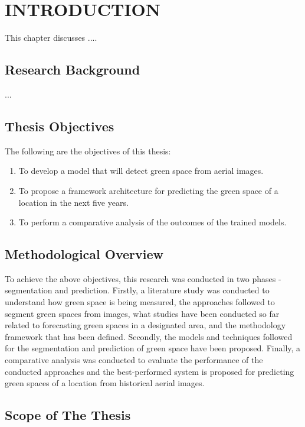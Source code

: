 
\chapter{INTRODUCTION}\label{intro}
\vspace{-3em}

This chapter discusses ....



\section{Research  Background}
...


\section{Thesis Objectives}

The following are the objectives of this thesis: 
\begin{enumerate}
    \item To develop a model that will detect green space from aerial images.

    \item To propose a framework architecture for predicting the green space of a location in the next five years.

    \item To perform a comparative analysis of the outcomes of the trained models.
\end{enumerate}


\section{Methodological Overview}
To achieve the above objectives, this research was conducted in two phases - segmentation and prediction. Firstly, a literature study was conducted to understand how green space is being measured, the approaches followed to segment green spaces from images, what studies have been conducted so far related to forecasting green spaces in a designated area, and the methodology framework that has been defined. Secondly, the models and techniques followed for the segmentation and prediction of green space have been proposed. Finally, a comparative analysis was conducted to evaluate the performance of the conducted approaches and the best-performed system is proposed for predicting green spaces of a location from historical aerial images. \


\section{Scope of The Thesis}

